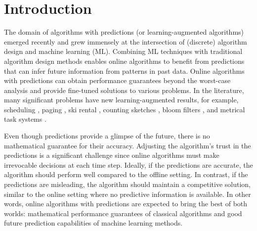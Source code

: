 
\section{Introduction}


The domain of algorithms with predictions \cite{MitzenmacherVassilvitskii20:Beyond-the-Worst-Case}  (or learning-augmented algorithms) emerged recently and grew immensely at the intersection of (discrete) algorithm design and machine learning (ML).
Combining ML techniques with traditional algorithm design methods enables online algorithms to benefit from predictions that can infer future information from patterns in past data. Online algorithms with predictions can obtain performance guarantees beyond the worst-case analysis and provide fine-tuned solutions to various problems. In the literature, many significant problems have new learning-augmented results, for example, scheduling \cite{LattanziLavastida20:Online-scheduling,Mitzenmacher20:Scheduling-with}, paging \cite{LykourisVassilvtiskii18:Competitive-caching,Rohatgi20:Near-optimal-bounds,AntoniadisCoester20:Online-metric}, ski rental \cite{GollapudiPanigrahi19:Online-algorithms,KumarPurohit18:Improving-online,AngelopoulosDurr20:Online-Computation}, counting sketches \cite{HsuIndyk19:Learning-Based-Frequency}, bloom filters \cite{KraskaBeutel18:The-case-for-learned,Mitzenmacher18:A-model-for-learned}, and metrical task systems \cite{AntoniosEtAll23:mixing-predictions-metric-algorithms}.

Even though predictions provide a glimpse of the future, there is no mathematical guarantee for their accuracy. Adjusting the algorithm's trust in the predictions is a significant challenge since online algorithms must make irrevocable decisions at each time step. Ideally, if the predictions are accurate, the algorithm should perform well compared to the offline setting. In contrast, if the predictions are misleading, the algorithm should maintain a competitive solution, similar to the online setting where no predictive information is available. In other words, online algorithms with predictions are expected to bring the best of both worlds: mathematical performance guarantees of classical algorithms and good future prediction capabilities of machine learning methods.

